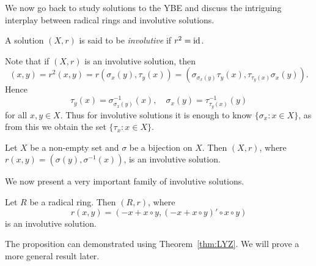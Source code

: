 We now go back to study solutions to the YBE and discuss the intriguing interplay
between radical rings and involutive solutions. 

\begin{definition}
	A solution $(X,r)$ is said to be \emph{involutive} if $r^2=\operatorname{id}$. 
\end{definition}

Note that if $(X,r)$ is an  involutive solution, then 
\[
(x,y)=r^2(x,y)=r(\sigma_x(y),\tau_y(x))=(\sigma_{\sigma_x(y)}\tau_y(x),\tau_{\tau_y(x)}\sigma_x(y)).
\]
Hence 
\begin{equation}
	\label{eq:involutive}
	\tau_y(x)=\sigma_{\sigma_x(y)}^{-1}(x),
	\quad
	\sigma_x(y)=\tau_{\tau_y(x)}^{-1}(y)
\end{equation}
for all $x,y\in X$. Thus for involutive solutions
it is enough to know $\{\sigma_x:x\in X\}$, as from this we obtain the
set $\{\tau_x:x\in X\}$.

\begin{example}
	Let $X$ be a non-empty set and $\sigma$ be a bijection on $X$. Then 
	$(X,r)$, where $r(x,y)=(\sigma(y),\sigma^{-1}(x))$, is an involutive solution. 
\end{example}

We now present a very important family of involutive solutions. 



\begin{theorem}[Rump]
	\label{thm:Rump}
	Let $R$ be a radical ring. Then $(R,r)$, where 
	\[
	r(x,y)=( -x+x\circ y,(-x+x\circ y)'\circ x\circ y)
	\]
	is an involutive solution.
\end{theorem}

The proposition can demonstrated using Theorem~\ref{thm:LYZ}. We will
prove a more general result later. 



 

